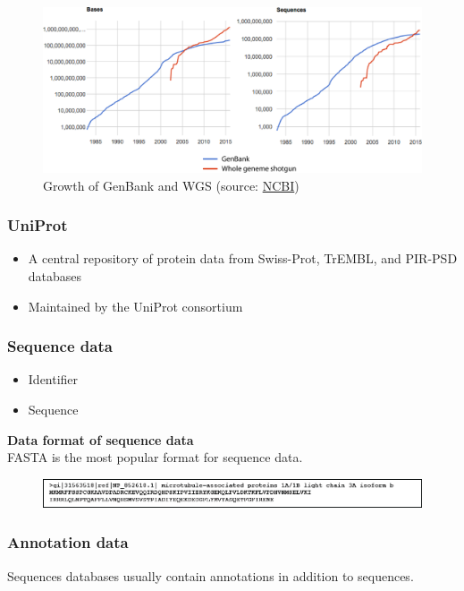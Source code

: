 \begin{figure}[H]
  \centering
      \includegraphics[width=0.6 \textwidth]{fig05/genebank_stat.png}
  \caption{Growth of GenBank and WGS (source: \href{http://www.ncbi.nlm.nih.gov/genbank/statistics}{NCBI})}
\end{figure}

%
%
\subsubsection*{UniProt} 
\begin{itemize}
\item A central repository of protein data from Swiss-Prot, TrEMBL, and PIR-PSD databases
\item Maintained by the UniProt consortium
\end{itemize}

%
%
\subsubsection*{Sequence data} 
\begin{itemize}
\item Identifier
\item Sequence
\end{itemize}

\noindent
\textbf{Data format of sequence data} \\
FASTA is the most popular format for sequence data.
\begin{figure}[H]
  \centering
      \includegraphics[width=\textwidth]{fig05/fasta.png}
\end{figure}

%
%
\subsubsection*{Annotation data} 
Sequences databases usually contain annotations in addition to sequences. 

